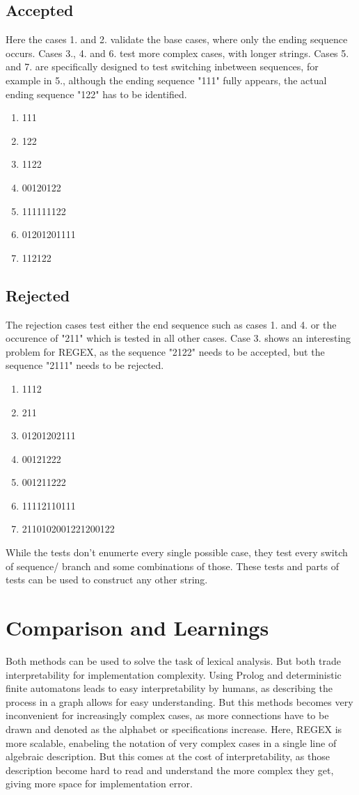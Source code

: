 \documentclass{article}
\begin{document}
\subsection{Accepted}
Here the cases 1. and 2. validate the base cases, where only the ending sequence occurs. 
Cases 3., 4. and 6. test more complex cases, with longer strings. Cases 5. and 7. are specifically
designed to test switching inbetween sequences, for example in 5., although the ending sequence "111" fully appears, 
the actual ending sequence "122" has to be identified. 
\begin{enumerate}
    \item 111
    \item 122
    \item 1122
    \item 00120122
    \item 111111122
    \item 01201201111
    \item 112122
\end{enumerate}
\subsection{Rejected}
The rejection cases test either the end sequence such as cases 1. and 4. or the occurence of "211" which is tested in all other cases.
Case 3. shows an interesting problem for REGEX, as the sequence "2122" needs to be accepted, but the sequence "2111" needs to be rejected.
\begin{enumerate}
    \item 1112
    \item 211
    \item 01201202111
    \item 00121222
    \item 001211222
    \item 11112110111
    \item 2110102001221200122
\end{enumerate}

While the tests don't enumerte every single possible case, they test every switch of sequence/ branch and some combinations of those.
These tests and parts of tests can be used to construct any other string.

\section{Comparison and Learnings}
Both methods can be used to solve the task of lexical analysis. 
But both trade interpretability for implementation complexity.
Using Prolog and deterministic finite automatons leads to easy interpretability by humans,
as describing the process in a graph allows for easy understanding. But this methods becomes very
inconvenient for increasingly complex cases, as more connections have to be drawn and denoted as the alphabet
or specifications increase. Here, REGEX is more scalable, enabeling the notation
of very complex cases in a single line of algebraic description. But this comes at the cost
of interpretability, as those description become hard to read and understand the more complex they get,
giving more space for implementation error.



\end{document}

